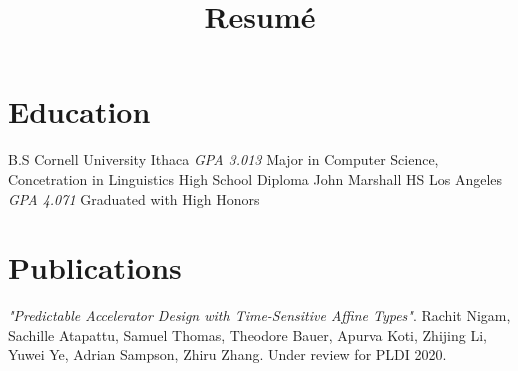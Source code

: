 \documentclass[10pt,a4paper,sans]{moderncv}        %
\title{Resumé}                                              %
\begin{document}
\makecvtitle

\section{Education}
{B.S}
{Cornell University}
{Ithaca}
{\textit{GPA 3.013}} %
{Major in Computer Science, Concetration in Linguistics}  %
%
{High School Diploma}
{John Marshall HS}
{Los Angeles}
{\textit{GPA 4.071}}
{Graduated with High Honors}

\section{Publications}
{\textit{"Predictable Accelerator Design with Time-Sensitive Affine Types"}.
  Rachit Nigam, Sachille Atapattu, Samuel Thomas, Theodore Bauer, Apurva Koti,
  Zhijing Li, Yuwei Ye, Adrian Sampson, Zhiru Zhang. Under review for PLDI 2020.}
\end{document}
